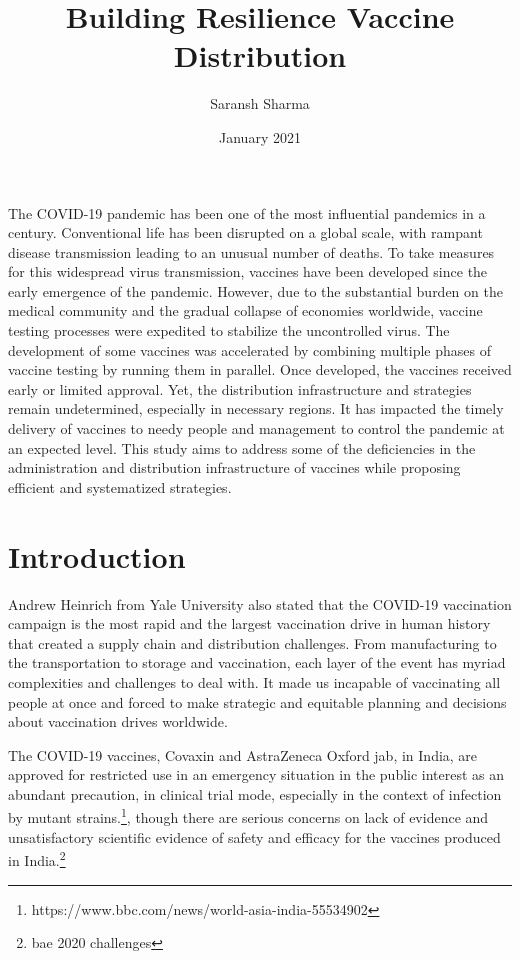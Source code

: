 \documentclass{article}
\begin{document}
\title{Building Resilience Vaccine Distribution}
\author{Saransh Sharma }
\date{January 2021}


\maketitle


\abstract

The COVID-19 pandemic has been one of the most inﬂuential pandemics in a century. Conventional life has been disrupted on a global scale, with rampant disease transmission leading to an unusual number of deaths. To take measures for this widespread virus transmission, vaccines have been developed since the early emergence of the pandemic. However, due to the substantial burden on the medical community and the gradual collapse of economies worldwide, vaccine testing processes were expedited to stabilize the uncontrolled virus. The development of some vaccines was accelerated by combining multiple phases of vaccine testing by running them in parallel. Once developed, the vaccines received early or limited approval. Yet, the distribution infrastructure and strategies remain undetermined, especially in necessary regions. It has impacted the timely delivery of vaccines to needy people and management to control the pandemic at an expected level. This study aims to address some of the deﬁciencies in the administration and distribution infrastructure of vaccines while proposing eﬃcient and systematized strategies.

\section{Introduction}
Andrew Heinrich from Yale University also stated that the COVID-19 vaccination campaign is the most rapid and the largest vaccination drive in human history that created a supply chain and distribution challenges. From manufacturing to the transportation to storage and vaccination, each layer of the event has myriad complexities and challenges to deal with. It made us incapable of vaccinating all people at once and forced to make strategic and equitable planning and decisions about vaccination drives worldwide.  

The COVID-19 vaccines, Covaxin and AstraZeneca Oxford jab, in India, are approved for restricted use in an emergency situation in the public interest as an abundant precaution, in clinical trial mode, especially in the context of infection by mutant strains.\footnote{https://www.bbc.com/news/world-asia-india-55534902}, though there are serious concerns on lack of evidence and unsatisfactory scientific evidence of safety and efficacy for the vaccines produced in India.\footnote{bae 2020 challenges} 
\end{document}
